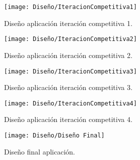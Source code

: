 \begin{figure}[ht!]
    \centering
    \texttt{[image: Diseño/IteracionCompetitiva1]}
    \caption{Diseño aplicación iteración competitiva 1.}
    \label{IteracionCompetitiva1}
\end{figure}
\begin{figure}[ht!]
    \centering
    \texttt{[image: Diseño/IteracionCompetitiva2]}
    \caption{Diseño aplicación iteración competitiva 2.}
    \label{IteracionCompetitiva2}
\end{figure}
\begin{figure}[ht!]
    \centering
    \texttt{[image: Diseño/IteracionCompetitiva3]}
    \caption{Diseño aplicación iteración competitiva 3.}
    \label{IteracionCompetitiva3}
\end{figure}
\begin{figure}[ht!]
    \centering
    \texttt{[image: Diseño/IteracionCompetitiva4]}
    \caption{Diseño aplicación iteración competitiva 4.}
    \label{IteracionCompetitiva4}
\end{figure}
\begin{figure}[ht!]
  \centering
  \texttt{[image: Diseño/Diseño Final]}
  \caption{Diseño final aplicación.}
  \label{diseño_final}
\end{figure}
